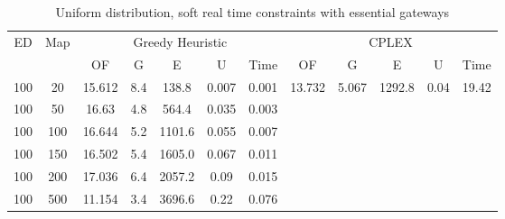 \begin{table}[htb]
	\centering
	\begin{tabular}{|c|c|c|c|c|c|c|c|c|c|c|c|}
		\hline
		\multirow{2}{*}{ED} & \multirow{2}{*}{Map} & \multicolumn{5}{c|}{Greedy Heuristic} & \multicolumn{5}{c|}{CPLEX}\\ 
		\cline{3-12}
&& OF & G & E & U & Time & OF & G & E & U & Time\\ 
		\hline
		100 & 20 & 15.612 & 8.4 & 138.8 & 0.007 & 0.001 & 13.732 & 5.067 & 1292.8 & 0.04 & 19.42 \\ 
		100 & 50 & 16.63 & 4.8 & 564.4 & 0.035 & 0.003 & & & & &  \\ 
		100 & 100 & 16.644 & 5.2 & 1101.6 & 0.055 & 0.007 & & & & &  \\ 
		100 & 150 & 16.502 & 5.4 & 1605.0 & 0.067 & 0.011 & & & & &  \\ 
		100 & 200 & 17.036 & 6.4 & 2057.2 & 0.09 & 0.015 & & & & &  \\ 
		100 & 500 & 11.154 & 3.4 & 3696.6 & 0.22 & 0.076 & & & & &  \\ 
		\hline 
	\end{tabular} 
	\caption{Uniform distribution, soft real time constraints with essential gateways} 
	\label{tab:unif_soft_esc} 
\end{table} 


